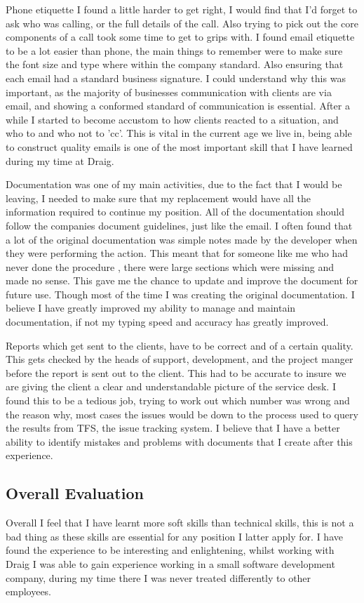 \documentclass[paper=a4, fontsize=11pt]{scrartcl}	%
\begin{document}
Phone etiquette I found a little harder to get right, I would find that I'd forget to ask who was calling, or the full details of the call. Also trying to pick out the core components of a call took some time to get to grips with. I found email etiquette to be a lot easier than phone, the main things to remember were to make sure the font size and type where within the company standard. Also ensuring that each email had a standard business signature. I could understand why this was important, as the majority of businesses communication with clients are via email, and showing a conformed standard of communication is essential. After a while I started to become accustom to how clients reacted to a situation, and who to and who not to 'cc'. This is vital in the current age we live in, being able to construct quality emails is one of the most important skill that I have learned during my time at Draig.

Documentation was one of my main activities, due to the fact that I would be leaving, I needed to make sure that my replacement would have all the information required to continue my position. All of the documentation should follow the companies document guidelines, just like the email. I often found that a lot of the original documentation was simple notes made by the developer when they were performing the action. This meant that for someone like me who had never done the procedure , there were large sections which were missing and made no sense. This gave me the chance to update and improve the document for future use. Though most of the time I was creating the original documentation. I believe I have greatly improved my ability to manage and maintain documentation, if not my typing speed and accuracy has greatly improved. 

Reports which get sent to the clients, have to be correct and of a certain quality. This gets checked by the heads of support, development, and the project manger before the report is sent out to the client. This had to be accurate to insure we are giving the client a clear and understandable picture   of the service desk. I found this to be a tedious job, trying to work out which number was wrong and the reason why, most cases the issues would be down to the process used to query the results from TFS, the issue tracking system. I believe that I have a better ability to identify mistakes and problems with documents that I create after this experience.

\subsection{Overall Evaluation}
Overall I feel that I have learnt more soft skills than technical skills, this is not a bad thing as these skills are essential for any position I latter apply for. I have found the experience to be interesting and enlightening, whilst working with Draig I was able to gain experience working in a small software development company, during my time there I was never treated differently to other employees.
\end{document}
